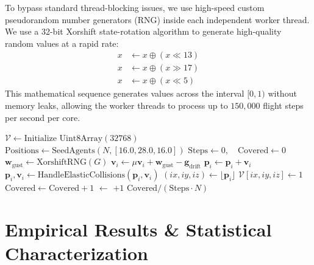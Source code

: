 \documentclass[letterpaper, 10pt, conference]{IEEEtran}
\begin{document}
To bypass standard thread-blocking issues, we use high-speed custom pseudorandom number generators (RNG) inside each independent worker thread. We use a 32-bit Xorshift state-rotation algorithm to generate high-quality random values at a rapid rate:
\begin{align}
    x &\leftarrow x \oplus (x \ll 13) \nonumber \\
    x &\leftarrow x \oplus (x \gg 17) \label{eq:xorshift} \\
    x &\leftarrow x \oplus (x \ll 5) \nonumber
\end{align}
This mathematical sequence generates values across the interval $[0, 1)$ without memory leaks, allowing the worker threads to process up to $150{,}000$ flight steps per second per core.

\begin{algorithm}[H]
\caption{vel-v5.5 Volumetric Coverage Loop}
\label{alg:simulation_loop}
\begin{algorithmic}[1]
    \State $\mathcal{V} \gets \text{Initialize Uint8Array}(32768)$
    \State $\text{Positions} \gets \text{SeedAgents}(N, [16.0, 28.0, 16.0])$
    \State $\text{Steps} \gets 0, \quad \text{Covered} \gets 0$
            \State $\mathbf{w}_{\text{gust}} \gets \text{XorshiftRNG}(G)$
            \State $\mathbf{v}_i \gets \mu \mathbf{v}_i + \mathbf{w}_{\text{gust}} - \mathbf{g}_{\text{drift}}$
            \State $\mathbf{p}_i \gets \mathbf{p}_i + \mathbf{v}_i$
            \State $\mathbf{p}_i, \mathbf{v}_i \gets \text{HandleElasticCollisions}(\mathbf{p}_i, \mathbf{v}_i)$
            \State $(ix, iy, iz) \gets \lfloor\mathbf{p}_i\rfloor$
                \State $\mathcal{V}[ix, iy, iz] \gets 1$
                \State $\text{Covered} \gets \text{Covered} + 1$
            \EndIf
        \EndFor
        \State {} $\gets$  $+ 1$
    \EndWhile
    \State \Return $\text{Covered} / (\text{Steps} \cdot N)$
\EndProcedure
\end{algorithmic}
\end{algorithm}

\section{Empirical Results \& Statistical Characterization}
\label{sec:results}
\end{document}

